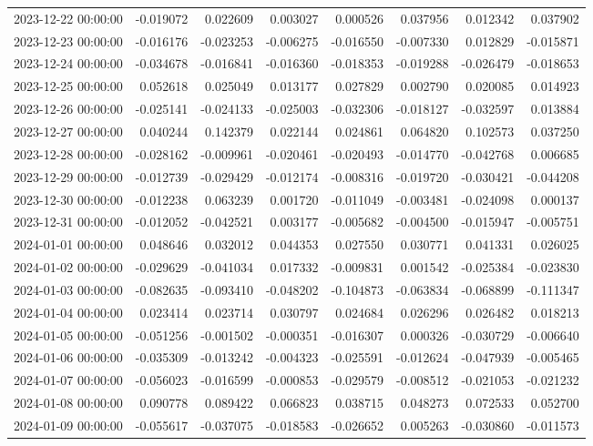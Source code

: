 \begin{tabular}{lrrrrrrr}
2023-12-22 00:00:00 & -0.019072 & 0.022609 & 0.003027 & 0.000526 & 0.037956 & 0.012342 & 0.037902 \\
2023-12-23 00:00:00 & -0.016176 & -0.023253 & -0.006275 & -0.016550 & -0.007330 & 0.012829 & -0.015871 \\
2023-12-24 00:00:00 & -0.034678 & -0.016841 & -0.016360 & -0.018353 & -0.019288 & -0.026479 & -0.018653 \\
2023-12-25 00:00:00 & 0.052618 & 0.025049 & 0.013177 & 0.027829 & 0.002790 & 0.020085 & 0.014923 \\
2023-12-26 00:00:00 & -0.025141 & -0.024133 & -0.025003 & -0.032306 & -0.018127 & -0.032597 & 0.013884 \\
2023-12-27 00:00:00 & 0.040244 & 0.142379 & 0.022144 & 0.024861 & 0.064820 & 0.102573 & 0.037250 \\
2023-12-28 00:00:00 & -0.028162 & -0.009961 & -0.020461 & -0.020493 & -0.014770 & -0.042768 & 0.006685 \\
2023-12-29 00:00:00 & -0.012739 & -0.029429 & -0.012174 & -0.008316 & -0.019720 & -0.030421 & -0.044208 \\
2023-12-30 00:00:00 & -0.012238 & 0.063239 & 0.001720 & -0.011049 & -0.003481 & -0.024098 & 0.000137 \\
2023-12-31 00:00:00 & -0.012052 & -0.042521 & 0.003177 & -0.005682 & -0.004500 & -0.015947 & -0.005751 \\
2024-01-01 00:00:00 & 0.048646 & 0.032012 & 0.044353 & 0.027550 & 0.030771 & 0.041331 & 0.026025 \\
2024-01-02 00:00:00 & -0.029629 & -0.041034 & 0.017332 & -0.009831 & 0.001542 & -0.025384 & -0.023830 \\
2024-01-03 00:00:00 & -0.082635 & -0.093410 & -0.048202 & -0.104873 & -0.063834 & -0.068899 & -0.111347 \\
2024-01-04 00:00:00 & 0.023414 & 0.023714 & 0.030797 & 0.024684 & 0.026296 & 0.026482 & 0.018213 \\
2024-01-05 00:00:00 & -0.051256 & -0.001502 & -0.000351 & -0.016307 & 0.000326 & -0.030729 & -0.006640 \\
2024-01-06 00:00:00 & -0.035309 & -0.013242 & -0.004323 & -0.025591 & -0.012624 & -0.047939 & -0.005465 \\
2024-01-07 00:00:00 & -0.056023 & -0.016599 & -0.000853 & -0.029579 & -0.008512 & -0.021053 & -0.021232 \\
2024-01-08 00:00:00 & 0.090778 & 0.089422 & 0.066823 & 0.038715 & 0.048273 & 0.072533 & 0.052700 \\
2024-01-09 00:00:00 & -0.055617 & -0.037075 & -0.018583 & -0.026652 & 0.005263 & -0.030860 & -0.011573 \\

\end{tabular}
